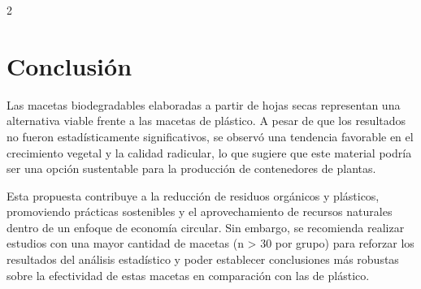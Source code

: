 \begin{multicols}{2}
\section{Conclusión}

Las macetas biodegradables elaboradas a partir de hojas secas representan una alternativa viable frente a las macetas de plástico. A pesar de que los resultados no fueron estadísticamente significativos, se observó una tendencia favorable en el crecimiento vegetal y la calidad radicular, lo que sugiere que este material podría ser una opción sustentable para la producción de contenedores de plantas.

Esta propuesta contribuye a la reducción de residuos orgánicos y plásticos, promoviendo prácticas sostenibles y el aprovechamiento de recursos naturales dentro de un enfoque de economía circular. Sin embargo, se recomienda realizar estudios con una mayor cantidad de macetas (n > 30 por grupo) para reforzar los resultados del análisis estadístico y poder establecer conclusiones más robustas sobre la efectividad de estas macetas en comparación con las de plástico.


    
    


\end{multicols}